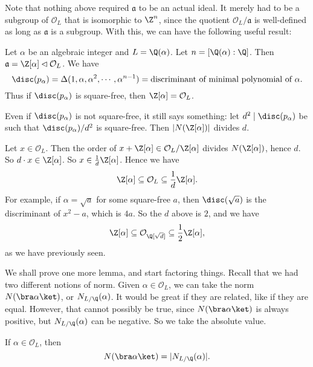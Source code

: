 \documentclass[a4paper]{article}
\begin{document}
Note that nothing above required $\mathfrak{a}$ to be an actual ideal. It merely had to be a subgroup of $\mathcal{O}_L$ that is isomorphic to $\Z^n$, since the quotient $\mathcal{O}_L/\mathfrak{a}$ is well-defined as long as $\mathfrak{a}$ is a subgroup. With this, we can have the following useful result:

\begin{eg}
  Let $\alpha$ be an algebraic integer and $L = \Q(\alpha)$. Let $n = [\Q(\alpha):\Q]$. Then $\mathfrak{a} = \Z[\alpha] \lhd \mathcal{O}_L$. We have
  \[
    \disc(p_\alpha) = \Delta(1, \alpha, \alpha^2, \cdots, \alpha^{n - 1}) = \text{discriminant of minimal polynomial of }\alpha.
  \]
  Thus if $\disc(p_\alpha)$ is square-free, then $\Z[\alpha] = \mathcal{O}_L$.

  Even if $\disc(p_\alpha)$ is not square-free, it still says something: let $d^2 \mid \disc(p_\alpha)$ be such that $\disc(p_\alpha)/d^2$ is square-free. Then $|N(\Z[\alpha])|$ divides $d$.

  Let $x \in \mathcal{O}_L$. Then the order of $x + \Z[\alpha] \in \mathcal{O}_L/\Z[\alpha]$ divides $N(\Z[\alpha])$, hence $d$. So $d \cdot x \in \Z[\alpha]$. So $x \in \frac{1}{d} \Z[\alpha]$. Hence we have
  \[
    \Z[\alpha] \subseteq \mathcal{O}_L \subseteq \frac{1}{d} \Z[\alpha].
  \]
  For example, if $\alpha = \sqrt{a}$ for some square-free $a$, then $\disc(\sqrt{a})$ is the discriminant of $x^2 - a$, which is $4a$. So the $d$ above is $2$, and we have
  \[
    \Z[\alpha] \subseteq \mathcal{O}_{\Q[\sqrt{d}]} \subseteq \frac{1}{2} \Z[\alpha],
  \]
  as we have previously seen.

\end{eg}

We shall prove one more lemma, and start factoring things. Recall that we had two different notions of norm. Given $\alpha \in \mathcal{O}_L$, we can take the norm $N(\bra \alpha\ket)$, or $N_{L/\Q}(\alpha)$. It would be great if they are related, like if they are equal. However, that cannot possibly be true, since $N(\bra \alpha\ket)$ is always positive, but $N_{L/\Q}(\alpha)$ can be negative. So we take the absolute value.
\begin{lemma}
  If $\alpha \in \mathcal{O}_L$, then
  \[
    N(\bra \alpha\ket) = |N_{L/\Q}(\alpha)|.
  \]
\end{lemma}
\end{document}
